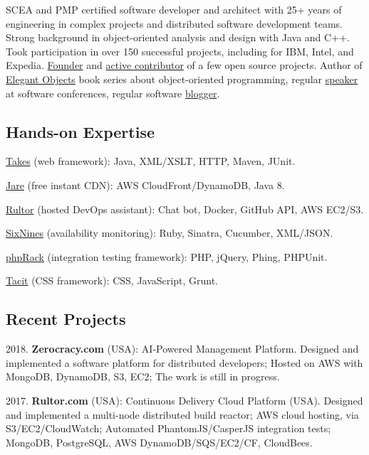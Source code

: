 \documentclass[12pt]{article}
\begin{document}
SCEA and PMP certified software developer and architect with
25+ years of engineering in complex projects and distributed software
development teams. Strong background in object-oriented analysis and design
with Java and C++. Took participation in over 150 successful projects,
including for IBM, Intel, and Expedia. \href{http://www.yegor256.com/pets.html}{Founder}
and \href{https://github.com/yegor256}{active contributor} of
a few open source projects. Author of
\href{http://www.yegor256.com/elegant-objects.html}{Elegant Objects}
book series about object-oriented programming,
regular \href{http://www.yegor256.com/talks.html}{speaker} at software conferences, regular software
\href{http://www.yegor256.com}{blogger}.

\subsection*{Hands-on Expertise}

\href{http://www.takes.org}{Takes} (web framework):
Java, XML/XSLT, HTTP, Maven, JUnit.

\href{http://www.jare.io}{Jare} (free instant CDN):
AWS CloudFront/DynamoDB, Java 8.

\href{http://www.rultor.com}{Rultor} (hosted DevOps assistant):
Chat bot, Docker, GitHub API, AWS EC2/S3.

\href{http://www.sixnines.io}{SixNines} (availability monitoring):
Ruby, Sinatra, Cucumber, XML/JSON.

\href{http://www.phprack.com}{phpRack} (integration testing framework):
PHP, jQuery, Phing, PHPUnit.

\href{https://github.com/yegor256/tacit}{Tacit} (CSS framework):
CSS, JavaScript, Grunt.

\subsection*{Recent Projects}

2018. \textbf{Zerocracy.com} (USA): AI-Powered Management Platform.
Designed and implemented a software platform for distributed developers;
Hosted on AWS with MongoDB, DynamoDB, S3, EC2;
The work is still in progress.

2017. \textbf{Rultor.com} (USA): Continuous Delivery Cloud Platform (USA).
Designed and implemented a multi-node distributed build reactor;
AWS cloud hosting, via S3/EC2/CloudWatch;
Automated PhantomJS/CasperJS integration tests;
MongoDB, PostgreSQL, AWS DynamoDB/SQS/EC2/CF, CloudBees.
\end{document}
